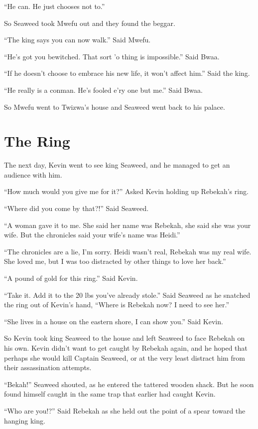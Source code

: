 ``He can. He just chooses not to.''

So Seaweed took Mwefu out and they found the beggar.

``The king says you can now walk.'' Said Mwefu.

``He's got you bewitched. That sort 'o thing is impossible.'' Said Bwaa.

``If he doesn't choose to embrace his new life, it won't affect him.'' Said the king.

``He really is a conman. He's fooled e'ry one but me.'' Said Bwaa.

So Mwefu went to Twizwa's house and Seaweed went back to his palace.


\section{The Ring}
The next day, Kevin went to see king Seaweed, and he managed to get an audience with him.

``How much would you give me for it?'' Asked Kevin holding up Rebekah's ring.

``Where did you come by that?!'' Said Seaweed.

``A woman gave it to me. She said her name was Rebekah, she said she was your wife. But the chronicles said your wife's name was Heidi.''

``The chronicles are a lie, I'm sorry. Heidi wasn't real, Rebekah was my real wife. She loved me, but I was too distracted by other things to love her back.''

``A pound of gold for this ring.'' Said Kevin.

``Take it. Add it to the 20 lbs you've already stole.'' Said Seaweed as he snatched the ring out of Kevin's hand, ``Where is Rebekah now? I need to see her.''

``She lives in a house on the eastern shore, I can show you.'' Said Kevin.

So Kevin took king Seaweed to the house and left Seaweed to face Rebekah on his own. Kevin didn't want to get caught by Rebekah again, and he hoped that perhaps she would kill Captain Seaweed, or at the very least distract him from their assassination attempts.

``Bekah!'' Seaweed shouted, as he entered the tattered wooden shack. But he soon found himself caught in the same trap that earlier had caught Kevin.

``Who are you!?'' Said Rebekah as she held out the point of a spear toward the hanging king.

